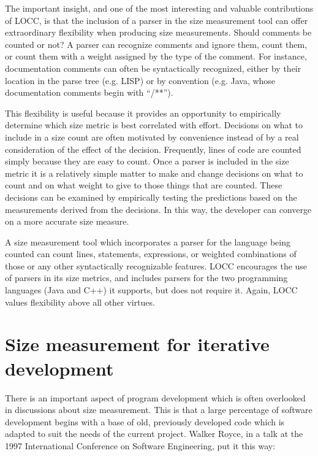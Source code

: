 The important insight, and one of the most interesting and valuable
contributions of LOCC, is that the inclusion of a parser in the size
measurement tool can offer extraordinary flexibility when producing
size measurements.  Should comments be counted or not?  A parser can
recognize comments and ignore them, count them, or count them with a
weight assigned by the type of the comment.  For instance,
documentation comments can often be syntactically recognized, either by
their location in the parse tree (e.g. LISP) or by convention (e.g. Java,
whose documentation comments begin with ``/**'').  

This flexibility is useful because it provides an opportunity to
empirically determine which size metric is best correlated with effort.
Decisions on what to include in a size count are often motivated by
convenience instead of by a real consideration of the effect of the
decision.  Frequently, lines of code are counted simply because they are
easy to count.  Once a parser is included in the size metric it is a
relatively simple matter to make and change decisions on what to count and
on what weight to give to those things that are counted.  These decisions
can be examined by empirically testing the predictions based on the
measurements derived from the decisions.  In this way, the developer can
converge on a more accurate size measure.

A size measurement tool which incorporates a parser for the language
being counted can count lines, statements, expressions, or weighted
combinations of those or any other syntactically recognizable
features.  LOCC encourages the use of parsers in its size metrics, and 
includes parsers for the two programming languages (Java and C++) it 
supports, but does not require it.  Again, LOCC values flexibility
above all other virtues.


\section{Size measurement for iterative development}
\label{sect:diff}

There is an important aspect of program development which is
often overlooked in discussions about size measurement.  This is that
a large percentage of software development begins with a base of old,
previously developed code which is adapted to suit the needs of the
current project.  Walker Royce, in a talk at the 1997 International
Conference on Software Engineering, put it this way:

